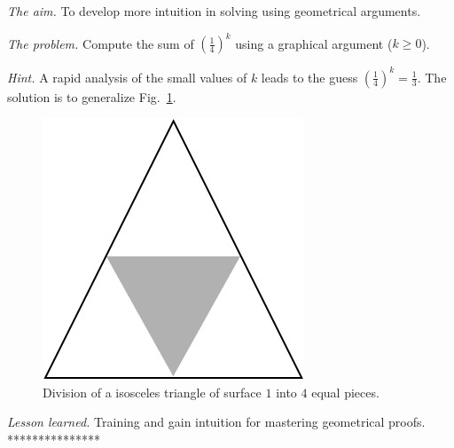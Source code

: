 {\noindent \textit{The aim.}
To develop more intuition in solving using geometrical arguments.
\medskip

\noindent \textit{The problem.}
Compute the sum of $(\frac{1}{4})^k$ using a graphical argument ($k \geq 0$).
\medskip

\noindent \textit{Hint.}
A rapid analysis of the small values of $k$ leads to the guess $(\frac{1}{4})^k = \frac{1}{3}$.
The solution is to generalize Fig.~\ref{fig:Sum1over4}.
 \begin{figure}[ht]
\begin{center}
       \includegraphics[scale=0.4]{FiguresMaths/Sum1over4}
\caption{Division of a isosceles triangle of surface $1$ into $4$ equal pieces.}
       \label{fig:Sum1over4}
\end{center}
\end{figure}
\medskip

\noindent \textit{Lesson learned.}
Training and gain intuition for mastering geometrical proofs. 
***************}
